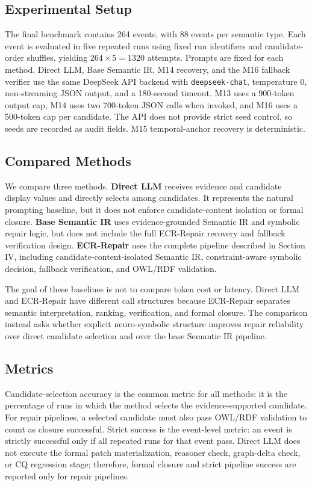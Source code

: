 \documentclass[conference]{IEEEtran}
\begin{document}
\subsection{Experimental Setup}

The final benchmark contains 264 events, with 88 events per semantic type. Each event is evaluated in five repeated runs using fixed run identifiers and candidate-order shuffles, yielding $264\times5=1320$ attempts. Prompts are fixed for each method. Direct LLM, Base Semantic IR, M14 recovery, and the M16 fallback verifier use the same DeepSeek API backend with \texttt{deepseek-chat}, temperature 0, non-streaming JSON output, and a 180-second timeout. M13 uses a 900-token output cap, M14 uses two 700-token JSON calls when invoked, and M16 uses a 500-token cap per candidate. The API does not provide strict seed control, so seeds are recorded as audit fields. M15 temporal-anchor recovery is deterministic.

\subsection{Compared Methods}

We compare three methods. \textbf{Direct LLM} receives evidence and candidate display values and directly selects among candidates. It represents the natural prompting baseline, but it does not enforce candidate-content isolation or formal closure. \textbf{Base Semantic IR} uses evidence-grounded Semantic IR and symbolic repair logic, but does not include the full ECR-Repair recovery and fallback verification design. \textbf{ECR-Repair} uses the complete pipeline described in Section IV, including candidate-content-isolated Semantic IR, constraint-aware symbolic decision, fallback verification, and OWL/RDF validation.

The goal of these baselines is not to compare token cost or latency. Direct LLM and ECR-Repair have different call structures because ECR-Repair separates semantic interpretation, ranking, verification, and formal closure. The comparison instead asks whether explicit neuro-symbolic structure improves repair reliability over direct candidate selection and over the base Semantic IR pipeline.

\subsection{Metrics}

Candidate-selection accuracy is the common metric for all methods: it is the percentage of runs in which the method selects the evidence-supported candidate. For repair pipelines, a selected candidate must also pass OWL/RDF validation to count as closure successful. Strict success is the event-level metric: an event is strictly successful only if all repeated runs for that event pass. Direct LLM does not execute the formal patch materialization, reasoner check, graph-delta check, or CQ regression stage; therefore, formal closure and strict pipeline success are reported only for repair pipelines.
\end{document}
